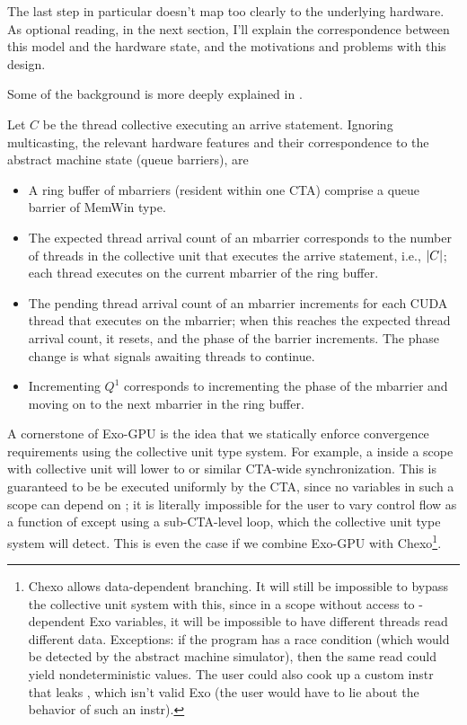 \filbreak
The last step in particular doesn't map too clearly to the underlying hardware.
As optional reading, in the next section, I'll explain the correspondence between this model and the hardware state, and the motivations and problems with this design.

\filbreak
{}

Some of the background is more deeply explained in .

Let $C$ be the thread collective executing an arrive statement.
Ignoring multicasting, the relevant hardware features and their correspondence to the abstract machine state (queue barriers), are
\begin{itemize}
  \item A ring buffer of mbarriers (resident within one CTA) comprise a queue barrier of  MemWin type.
  \filbreak
  \item The expected thread arrival count of an mbarrier corresponds to the number of threads in the collective unit that executes the arrive statement, i.e., $\left \vert C \right\vert$; each thread executes  on the current mbarrier of the ring buffer.
  \filbreak
  \item The pending thread arrival count of an mbarrier increments for each CUDA thread that executes  on the mbarrier; when this reaches the expected thread arrival count, it resets, and the phase of the barrier increments.
  The phase change is what signals awaiting threads to continue.
  \filbreak
  \item Incrementing $Q^1$ corresponds to incrementing the phase of the mbarrier and moving on to the next mbarrier in the ring buffer.
\end{itemize}

\filbreak
A cornerstone of Exo-GPU is the idea that we statically enforce convergence requirements using the collective unit type system.
For example, a  inside a scope with collective unit  will lower to  or similar CTA-wide synchronization.
This is guaranteed to be be executed uniformly by the CTA, since no variables in such a scope can depend on ; it is literally impossible for the user to vary control flow as a function of  except using a sub-CTA-level  loop, which the collective unit type system will detect.
This is even the case if we combine Exo-GPU with Chexo\footnote{Chexo allows data-dependent branching. It will still be impossible to bypass the collective unit system with this, since in a scope without access to -dependent Exo variables, it will be impossible to have different threads read different data. Exceptions: if the program has a race condition (which would be detected by the abstract machine simulator), then the same read could yield nondeterministic values. The user could also cook up a custom instr that leaks , which isn't valid Exo (the user would have to lie about the behavior of such an instr).}.

